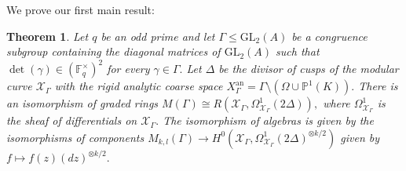 \documentclass[11pt]{amsart}
\newtheorem{theorem}{Theorem}[section]
\theoremstyle{definition}
\numberwithin{equation}{section}
\newcommand{\GL}{\mathrm{GL}} 	%
\newcommand{\sX}{\mathscr{X}}		%
\newcommand{\bbF}{\mathbb{F}}		%
\newcommand{\bbP}{\mathbb{P}}		%
\begin{document}
		We prove our first main result:
		
		\begin{theorem}\label{thm: forms to differentials}
			Let $q$ be an odd prime and let $\Gamma\leq \GL_2(A)$ be a congruence subgroup containing the diagonal matrices of $\GL_2(A)$ such that $\det(\gamma)\in (\bbF_q^{\times})^2$ for every $\gamma\in \Gamma.$ Let $\Delta$ be the divisor of cusps of the modular curve $\sX_{\Gamma}$ with the rigid analytic coarse space $X_{\Gamma}^{\text{an}}=\Gamma\setminus(\Omega\cup \bbP^1(K)).$ 
			There is an isomorphism of graded rings $M(\Gamma)\cong R(\sX_{\Gamma},\Omega^1_{\sX_{\Gamma}}(2\Delta)),$ where $\Omega^1_{\sX_{\Gamma}}$ is the sheaf of differentials on $\sX_{\Gamma}.$ The isomorphism of algebras is given by the isomorphisms of components $M_{k,l}(\Gamma)\to H^0(\sX_{\Gamma},\Omega^1_{\sX_{\Gamma}}(2\Delta)^{\otimes k/2})$ given by $f\mapsto f(z)(dz)^{\otimes k/2}.$ 
		\end{theorem}
\end{document}
